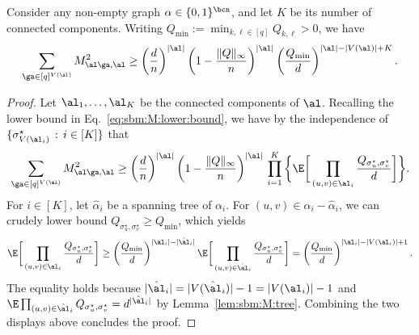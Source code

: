 \documentclass[11pt]{article}
\begin{document}
\begin{lemma}\label{lem:sbm:M:lower:bound}
Consider any non-empty graph $\alpha \in \{0,1\}^{\bcn}$, and let $K$ be its number of connected components. Writing $Q_{\min}:=\min_{k,\ell\in [q]}Q_{k,\ell}>0$, we have
\[
\sum_{\ga\in [q]^{V(\al)}}M_{\al\ga,\al}^2 \geq \left(\frac{d}{n}\right)^{|\al|}\left(1-\frac{\|Q\|_{\infty}}{n}\right)^{|\al|} \left(\frac{Q_{\min}}{d}\right)^{|\al|-|V(\al)|+K}.
\]
\begin{proof}
    Let $\al_1,\ldots, \al_K$ be the connected components of $\al$. Recalling the lower bound in Eq.~\eqref{eq:sbm:M:lower:bound}, we have by the independence of $\{\sigma^\star_{V(\al_i)} \,:\, i \in [K]\}$ that
    \[
    \sum_{\ga\in [q]^{V(\al)}}M_{\al\ga,\al}^2 \geq \left(\frac{d}{n}\right)^{|\al|}\left(1-\frac{\|Q\|_{\infty}}{n}\right)^{|\al|} \,\prod_{i=1}^{K} \bigg\{\E\bigg[\prod_{(u,v)\in \al_i}\frac{Q_{\sigma^\star_u,\sigma^\star_v}}{d}\bigg]\bigg\}.
    \]
    For $i\in [K]$, let $\hat{\alpha}_i$ be a spanning tree of $\alpha_i$. For $(u,v)\in \alpha_i-\hat{\alpha}_i$, we can crudely lower bound $Q_{\sigma^\star_u,\sigma^\star_v}\geq Q_{\min}$, which yields
    \[
    \E\bigg[\prod_{(u,v)\in \al_i}\frac{Q_{\sigma^\star_u,\sigma^\star_v}}{d}\bigg]\geq \left(\frac{Q_{\min}}{d}\right)^{|\al_i|-|\hat{\al}_i|} \E\bigg[\prod_{(u,v)\in \hat\al_i}\frac{Q_{\sigma^\star_u,\sigma^\star_v}}{d}\bigg]=\left(\frac{Q_{\min}}{d}\right)^{|\al_i|-|V(\al_i)|+1}.
    \]
    The equality holds because $|\hat\al_i|=|V(\hat\al_i)|-1=|V(\al_i)|-1$ and $\E\prod_{(u,v)\in \hat\al_i}Q_{\sigma^\star_u,\sigma^\star_v}=d^{|\hat\al_i|}$ by Lemma~\ref{lem:sbm:M:tree}. Combining the two displays above concludes the proof.
\end{proof}
\end{lemma}
\end{document}
